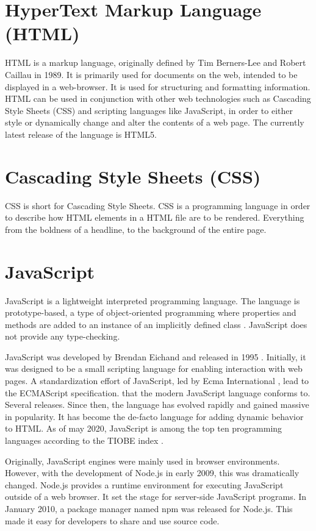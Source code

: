 \section{HyperText Markup Language (HTML)}
HTML is a markup language, originally defined by Tim Berners-Lee and Robert Caillau in 1989. It is primarily used for documents on the web, intended to be displayed in a web-browser. It is used for structuring and formatting information. HTML can be used in conjunction with other web technologies such as Cascading Style Sheets (CSS) and scripting languages like JavaScript, in order to either style or dynamically change and alter the contents of a web page. The currently latest release of the language is HTML5.

\section{Cascading Style Sheets (CSS)}
CSS is short for Cascading Style Sheets. CSS is a programming language in order to describe how HTML elements in a HTML file are to be rendered. Everything from the boldness of a headline, to the background of the entire page.

\section{JavaScript}
JavaScript is a lightweight interpreted programming language. The language is prototype-based, a type of object-oriented programming where properties and methods are added to an instance of an implicitly defined class \cite{prototype-based-programming}. JavaScript does not provide any type-checking.

JavaScript was developed by Brendan Eichand and released in 1995 \cite{javascript-original-release}. Initially, it was designed to be a small scripting language for enabling interaction with web pages. A standardization effort of JavaScript, led by Ecma International \cite{ecma-international}, lead to the ECMAScript specification.  that the modern JavaScript language conforms to. Several releases. Since then, the language has evolved rapidly and gained massive in popularity. It has become the de-facto language for adding dynamic behavior to HTML. As of may 2020, JavaScript is among the top ten programming languages according to the TIOBE index \cite{tiobe-index}.

Originally, JavaScript engines were mainly used in browser environments. However, with the development of Node.js in early 2009, this was dramatically changed. Node.js provides a runtime environment for executing JavaScript outside of a web browser. It set the stage for server-side JavaScript programs. In January 2010, a package manager named npm \cite{npm} was released for Node.js. This made it easy for developers to share and use source code.

